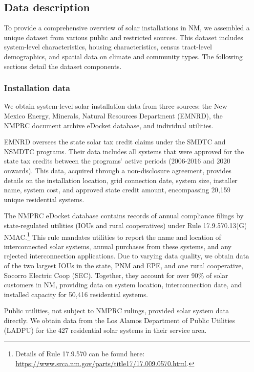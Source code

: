 \documentclass[11pt,twoside,letterpaper]{article}
\begin{document}
\subsection{Data description}
\label{section:data_collect}

To provide a comprehensive overview of solar installations in NM, we assembled a unique dataset from various public and restricted sources. This dataset includes system-level characteristics, housing characteristics, census tract-level demographics, and spatial data on climate and community types. The following sections detail the dataset components.

\subsubsection{Installation data}

We obtain system-level solar installation data from three sources: the New Mexico Energy, Minerals, Natural Resources Department (EMNRD), the NMPRC document archive eDocket database, and individual utilities. 

EMNRD oversees the state solar tax credit claims under the SMDTC and NSMDTC programs. Their data includes all systems that were approved for the state tax credits between the programs' active periods (2006-2016 and 2020 onwards). This data, acquired through a non-disclosure agreement, provides details on the installation location, grid connection date, system size, installer name, system cost, and approved state credit amount, encompassing 20,159 unique residential systems.

The NMPRC eDocket database contains records of annual compliance filings by state-regulated utilities (IOUs and rural cooperatives) under Rule 17.9.570.13(G) NMAC.\footnote{Details of Rule 17.9.570 can be found here: \url{https://www.srca.nm.gov/parts/title17/17.009.0570.html}.} This rule mandates utilities to report the name and location of interconnected solar systems, annual purchases from these systems, and any rejected interconnection applications. Due to varying data quality, we obtain data of the two largest IOUs in the state, PNM and EPE, and one rural cooperative, Socorro Electric Coop (SEC). Together, they account for over 90\% of solar customers in NM, providing data on system location, interconnection date, and installed capacity for 50,416 residential systems.

Public utilities, not subject to NMPRC rulings, provided solar system data directly. We obtain data from the Los Alamos Department of Public Utilities (LADPU) for the 427 residential solar systems in their service area.
\end{document}
